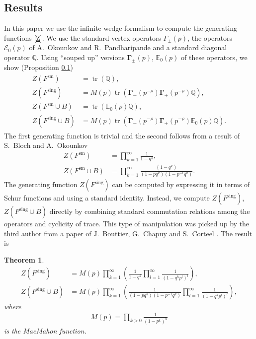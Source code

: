 \documentclass{amsart}
\newtheorem{theorem}{Theorem}%
\theoremstyle{definition}
\newcommand{\QQ} {\mathbb{Q}}		%
\newcommand{\bfGamma} {\mathbf{\Gamma}}
\newcommand{\sm}{\mathrm{sm}}
\newcommand{\sing}{\mathrm{sing}}
\newcommand{\E}{\mathcal{E}}
\newcommand{\EE}{\mathbb{E}}
\newcommand{\tr}{\operatorname{tr}}
\begin{document}
\subsection{Results} In this paper we use the infinite wedge formalism to compute the generating functions \eqref{Z}. We use the standard vertex operators $\Gamma_{\pm}(p)$, the operators $\E_0(p)$ of A.~Okounkov and R.~Pandharipande \cite{OP} and a standard diagonal operator $\QQ$. Using ``souped up'' versions $\bfGamma_{\pm}(p)$, $\EE_0(p)$ of these operators, we show (Proposition \ref{})
\begin{align} \label{Z}
\begin{split}
Z(F^{\sm}) &= \tr(\QQ), \\
Z(F^{\sing}) &= M(p) \tr(\bfGamma_-(p^{-\rho}) \bfGamma_+(p^{-\rho}) \QQ), \\
Z(F^{\sm} \cup B) &= \tr(\EE_0(p) \QQ), \\
Z(F^{\sing} \cup B) &= M(p) \tr(\bfGamma_-(p^{-\rho}) \bfGamma_+(p^{-\rho}) \EE_0(p) \QQ). 
\end{split}
\end{align}
The first generating function is trivial and the second follows from a result of S.~Bloch and A.~Okounkov \cite{BO} 
\begin{align*} 
Z(F^{\sm}) &= \prod_{k=1}^{\infty} \frac{1}{1-q^k}, \\
Z(F^{\sm} \cup B) &= \prod_{k=1}^{\infty} \frac{(1-q^k)}{(1-p q^k)(1-p^{-1} q^k)}.
\end{align*}
The generating function $Z(F^{\sing})$ can be computed by expressing it in terms of Schur functions and using a standard identity. Instead, we compute $Z(F^{\sing})$, $Z(F^{\sing} \cup B)$ directly by combining standard commutation relations among the operators and cyclicity of trace. This type of manipulation was picked up by the third author from a paper of J.~Bouttier, G.~Chapuy and S.~Corteel \cite{BCC}. The result is 
\begin{theorem} \label{main}
\begin{align*} 
Z(F^{\sing}) &= M(p) \prod_{k=1}^{\infty} \left( \frac{1}{1-q^k} \prod_{l=1}^{\infty} \frac{1}{(1-q^k p^l)^l} \right), \\
Z(F^{\sing} \cup B) &= M(p) \prod_{k=1}^{\infty} \left( \frac{1}{(1-p q^k)(1-p^{-1} q^k)} \prod_{l=1}^{\infty} \frac{1}{(1-q^k p^l)^l} \right), 
\end{align*}
where 
\begin{align*}
M(p) = \prod_{k>0} \frac{1}{(1-p^k)^k}
\end{align*}
is the MacMahon function.
\end{theorem}
\end{document}
